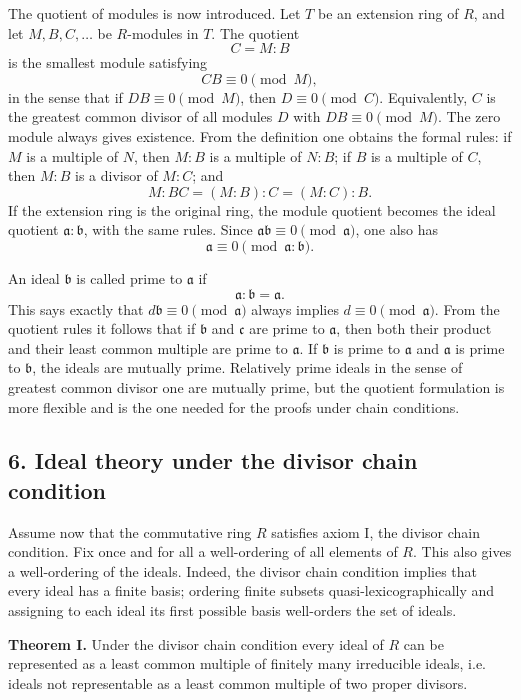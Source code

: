 \documentclass[11pt]{article}
\begin{document}
The quotient of modules is now introduced. Let $T$ be an extension ring of $R$, and let $M,B,C,\ldots$ be $R$-modules in $T$. The quotient
\[
  C=M:B
\]
is the smallest module satisfying
\[
  CB\equiv0\pmod M,
\]
in the sense that if $DB\equiv0\pmod M$, then $D\equiv0\pmod C$. Equivalently, $C$ is the greatest common divisor of all modules $D$ with $DB\equiv0\pmod M$. The zero module always gives existence. From the definition one obtains the formal rules: if $M$ is a multiple of $N$, then $M:B$ is a multiple of $N:B$; if $B$ is a multiple of $C$, then $M:B$ is a divisor of $M:C$; and
\[
  M:BC=(M:B):C=(M:C):B.
\]
If the extension ring is the original ring, the module quotient becomes the ideal quotient $\mathfrak a:\mathfrak b$, with the same rules. Since $\mathfrak a\mathfrak b\equiv0\pmod{\mathfrak a}$, one also has
\[
  \mathfrak a\equiv0\pmod{\mathfrak a:\mathfrak b}.
\]

An ideal $\mathfrak b$ is called prime to $\mathfrak a$ if
\[
  \mathfrak a:\mathfrak b=\mathfrak a.
\]
This says exactly that $d\mathfrak b\equiv0\pmod{\mathfrak a}$ always implies $d\equiv0\pmod{\mathfrak a}$. From the quotient rules it follows that if $\mathfrak b$ and $\mathfrak c$ are prime to $\mathfrak a$, then both their product and their least common multiple are prime to $\mathfrak a$. If $\mathfrak b$ is prime to $\mathfrak a$ and $\mathfrak a$ is prime to $\mathfrak b$, the ideals are mutually prime. Relatively prime ideals in the sense of greatest common divisor one are mutually prime, but the quotient formulation is more flexible and is the one needed for the proofs under chain conditions.

\subsection{6. Ideal theory under the divisor chain condition}

Assume now that the commutative ring $R$ satisfies axiom I, the divisor chain condition. Fix once and for all a well-ordering of all elements of $R$. This also gives a well-ordering of the ideals. Indeed, the divisor chain condition implies that every ideal has a finite basis; ordering finite subsets quasi-lexicographically and assigning to each ideal its first possible basis well-orders the set of ideals.

\textbf{Theorem I.} Under the divisor chain condition every ideal of $R$ can be represented as a least common multiple of finitely many irreducible ideals, i.e. ideals not representable as a least common multiple of two proper divisors.
\end{document}
